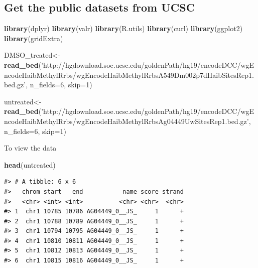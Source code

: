 \documentclass[9pt,a4paper]{extarticle}
\renewcommand{\KeywordTok}[1]{\textbf{{#1}}}
\renewcommand{\DataTypeTok}[1]{\textcolor[rgb]{0.50,0.00,0.00}{{#1}}}
\renewcommand{\DecValTok}[1]{\textcolor[rgb]{0.00,0.00,1.00}{{#1}}}
\renewcommand{\StringTok}[1]{\textcolor[rgb]{0.87,0.00,0.00}{{#1}}}
\renewcommand{\NormalTok}[1]{{#1}}
\begin{document}
\subsection{Get the public datasets from
UCSC}\label{get-the-public-datasets-from-ucsc}

\begin{Shaded}
\begin{Highlighting}[]
\KeywordTok{library}\NormalTok{(dplyr)}
\KeywordTok{library}\NormalTok{(valr)}
\KeywordTok{library}\NormalTok{(R.utils)}
\KeywordTok{library}\NormalTok{(curl)}
\KeywordTok{library}\NormalTok{(ggplot2)}
\KeywordTok{library}\NormalTok{(gridExtra)}
\end{Highlighting}
\end{Shaded}

\begin{Shaded}
\begin{Highlighting}[]
\NormalTok{DMSO_treated<-}\KeywordTok{read_bed}\NormalTok{(}\StringTok{'http://hgdownload.soe.ucsc.edu/goldenPath/hg19/encodeDCC/wgEncodeHaibMethylRrbs/wgEncodeHaibMethylRrbsA549Dm002p7dHaibSitesRep1.bed.gz'}\NormalTok{, }\DataTypeTok{n_fields=}\DecValTok{6}\NormalTok{, }\DataTypeTok{skip=}\DecValTok{1}\NormalTok{)}
\end{Highlighting}
\end{Shaded}

\begin{Shaded}
\begin{Highlighting}[]
\NormalTok{untreated<-}\KeywordTok{read_bed}\NormalTok{(}\StringTok{'http://hgdownload.soe.ucsc.edu/goldenPath/hg19/encodeDCC/wgEncodeHaibMethylRrbs/wgEncodeHaibMethylRrbsAg04449UwSitesRep1.bed.gz'}\NormalTok{, }\DataTypeTok{n_fields=}\DecValTok{6}\NormalTok{, }\DataTypeTok{skip=}\DecValTok{1}\NormalTok{)}
\end{Highlighting}
\end{Shaded}

To view the data

\begin{Shaded}
\begin{Highlighting}[]
\KeywordTok{head}\NormalTok{(untreated)}
\end{Highlighting}
\end{Shaded}

\begin{verbatim}
#> # A tibble: 6 x 6
#>   chrom start   end           name score strand
#>   <chr> <int> <int>          <chr> <chr>  <chr>
#> 1  chr1 10785 10786 AG04449_0__JS_     1      +
#> 2  chr1 10788 10789 AG04449_0__JS_     1      +
#> 3  chr1 10794 10795 AG04449_0__JS_     1      +
#> 4  chr1 10810 10811 AG04449_0__JS_     1      +
#> 5  chr1 10812 10813 AG04449_0__JS_     1      +
#> 6  chr1 10815 10816 AG04449_0__JS_     1      +
\end{verbatim}
\end{document}
